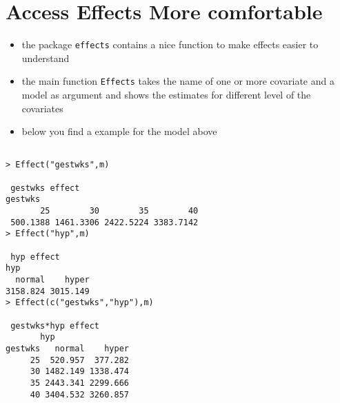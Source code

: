 \documentclass[11pt]{article}
\begin{document}
\section{Access Effects More comfortable}
\begin{itemize}
\item the package \texttt{effects} contains a nice function to make effects easier to understand
\item the main function \texttt{Effects} takes the name of one or more covariate and a model as argument and shows the estimates for different level of the covariates
\item below you find a example for the model above
\end{itemize}

\begin{verbatim}

> Effect("gestwks",m)

 gestwks effect
gestwks
       25        30        35        40 
 500.1388 1461.3306 2422.5224 3383.7142 
> Effect("hyp",m)

 hyp effect
hyp
  normal    hyper 
3158.824 3015.149 
> Effect(c("gestwks","hyp"),m)

 gestwks*hyp effect
       hyp
gestwks   normal    hyper
     25  520.957  377.282
     30 1482.149 1338.474
     35 2443.341 2299.666
     40 3404.532 3260.857
  
\end{verbatim}
\end{document}
